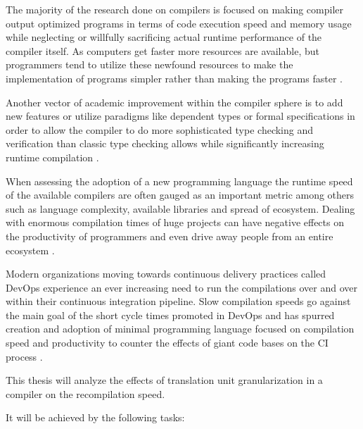 \documentclass{VUMIFPSbakalaurinis}
\begin{document}


The majority of the research done on compilers is focused on making compiler output optimized programs in terms of code execution speed and memory usage \cite{lopes2018future} while neglecting or willfully sacrificing \cite{fast2019compilers} actual runtime performance of the compiler itself.
As computers get faster more resources are available, but programmers tend to utilize these newfound resources to make the implementation of programs simpler rather than making the programs faster \cite{Wirth1995}.

Another vector of academic improvement within the compiler sphere is to add new features or utilize paradigms like dependent types or formal specifications \cite{RustVerification} in order to allow the compiler to do more sophisticated type checking and verification than classic type checking allows while significantly increasing runtime compilation .

When assessing the adoption of a new programming language the runtime speed of the available compilers are often gauged as an important metric \cite{ScalaSlow} among others such as language complexity, available libraries and spread of ecosystem.
Dealing with enormous compilation times of huge projects can have negative effects on the productivity of programmers and even drive away people from an entire ecosystem \cite{ScalaReallySlow, ScalaSlow}.

Modern organizations moving towards continuous delivery practices called DevOps \cite{DevOps} experience an ever increasing need to run the compilations over and over within their continuous integration pipeline.
Slow compilation speeds go against the main goal of the short cycle times promoted in DevOps and has spurred creation and adoption of minimal programming language focused on compilation speed and productivity to counter the effects of giant code bases on the CI process \cite{TheGoProgrammingLanguage, GoGoogle}.

This thesis will analyze the effects of translation unit granularization in a compiler on the recompilation speed.

It will be achieved by the following tasks:
\end{document}
